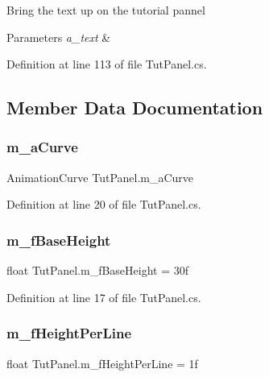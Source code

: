 Bring the text up on the tutorial pannel 


\begin{DoxyParams}{Parameters}
{\em a\+\_\+text} & \\
\hline
\end{DoxyParams}


Definition at line 113 of file Tut\+Panel.\+cs.



\subsection{Member Data Documentation}
\mbox{\label{class_tut_panel_aace257a95f38d116378d58c446ccbdc4}} 
\subsubsection{\texorpdfstring{m\+\_\+a\+Curve}{m\_aCurve}}
{\footnotesize\ttfamily Animation\+Curve Tut\+Panel.\+m\+\_\+a\+Curve}



Definition at line 20 of file Tut\+Panel.\+cs.

\mbox{\label{class_tut_panel_a640bbf40fd31c98582602b635c2741da}} 
\subsubsection{\texorpdfstring{m\+\_\+f\+Base\+Height}{m\_fBaseHeight}}
{\footnotesize\ttfamily float Tut\+Panel.\+m\+\_\+f\+Base\+Height = 30f}



Definition at line 17 of file Tut\+Panel.\+cs.

\mbox{\label{class_tut_panel_a721439ce1fbce9eca43ec78a89503927}} 
\subsubsection{\texorpdfstring{m\+\_\+f\+Height\+Per\+Line}{m\_fHeightPerLine}}
{\footnotesize\ttfamily float Tut\+Panel.\+m\+\_\+f\+Height\+Per\+Line = 1f}



